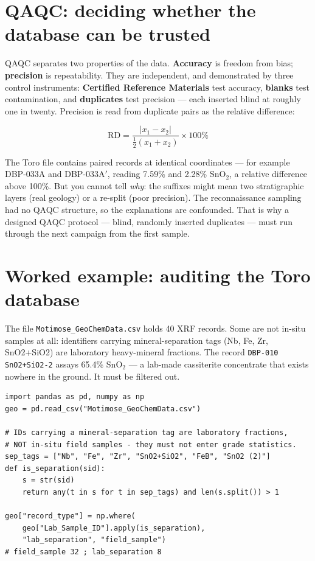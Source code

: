 \documentclass[11pt]{article}
\begin{document}
\section{QAQC: deciding whether the database can be trusted}

QAQC separates two properties of the data. \textbf{Accuracy} is freedom
from bias; \textbf{precision} is repeatability. They are independent, and
demonstrated by three control instruments: \textbf{Certified Reference
Materials} test accuracy, \textbf{blanks} test contamination, and
\textbf{duplicates} test precision --- each inserted blind at roughly one
in twenty. Precision is read from duplicate pairs as the relative
difference:

\begin{eqbox}
\[ \mathrm{RD} = \frac{|x_1-x_2|}{\tfrac{1}{2}(x_1+x_2)}\times 100\%
   \tag{2.6}\]
\end{eqbox}

\begin{pitbox}
The Toro file contains paired records at identical coordinates --- for
example DBP-033A and DBP-033A$'$, reading 7.59\% and 2.28\% SnO$_2$, a
relative difference above 100\%. But you cannot tell \emph{why}: the
suffixes might mean two stratigraphic layers (real geology) or a re-split
(poor precision). The reconnaissance sampling had no QAQC structure, so
the explanations are confounded. That is why a designed QAQC protocol ---
blind, randomly inserted duplicates --- must run through the next campaign
from the first sample.
\end{pitbox}

\section{Worked example: auditing the Toro database}

The file \texttt{Motimose\_GeoChemData.csv} holds 40 XRF records. Some
are not in-situ samples at all: identifiers carrying mineral-separation
tags (Nb, Fe, Zr, SnO2+SiO2) are laboratory heavy-mineral fractions. The
record \texttt{DBP-010 SnO2+SiO2-2} assays 65.4\% SnO$_2$ --- a lab-made
cassiterite concentrate that exists nowhere in the ground. It must be
filtered out.

\begin{lstlisting}
import pandas as pd, numpy as np
geo = pd.read_csv("Motimose_GeoChemData.csv")

# IDs carrying a mineral-separation tag are laboratory fractions,
# NOT in-situ field samples - they must not enter grade statistics.
sep_tags = ["Nb", "Fe", "Zr", "SnO2+SiO2", "FeB", "SnO2 (2)"]
def is_separation(sid):
    s = str(sid)
    return any(t in s for t in sep_tags) and len(s.split()) > 1

geo["record_type"] = np.where(
    geo["Lab_Sample_ID"].apply(is_separation),
    "lab_separation", "field_sample")
# field_sample 32 ; lab_separation 8
\end{lstlisting}
\end{document}
